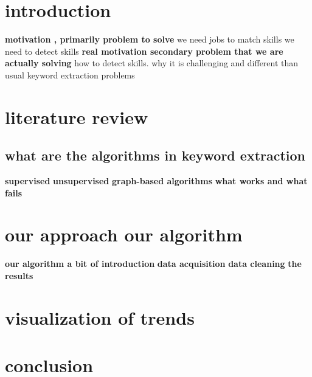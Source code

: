 \documentclass[11pt]{report}%
\begin{document}
\chapter{introduction}
\textbf{motivation , primarily problem to solve}
we need jobs to match skills we need to detect skills
\textbf{real motivation secondary problem that we are actually solving}
how to detect skills. why it is challenging and different than usual keyword extraction problems 

\chapter{literature review}
\section{what are the algorithms in keyword extraction }
\textbf{supervised}
\textbf{unsupervised}
\textbf{graph-based algorithms}
\textbf{what works and what fails}

\chapter{our approach our algorithm}
\textbf{our algorithm a bit of introduction}
\textbf{data acquisition}
\textbf{data cleaning}
\textbf{the results}

\chapter{visualization of trends}

\chapter{conclusion}
\end{document}
